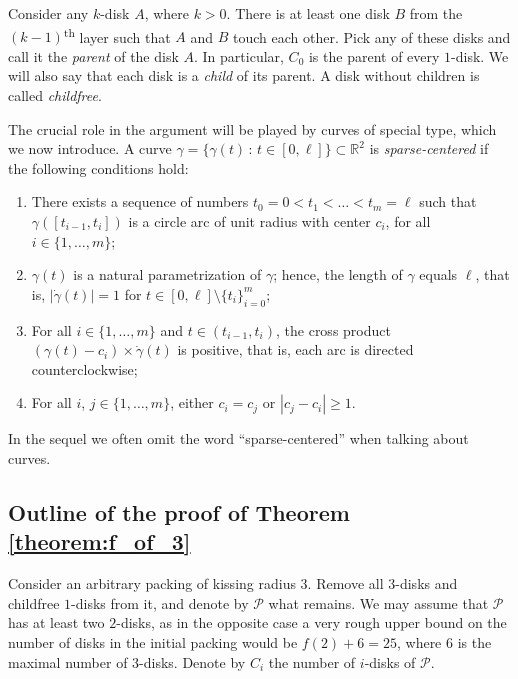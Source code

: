 Consider any $k$-disk $A$, where $k > 0$. There is at least one disk $B$ from the $(k-1)$\textsuperscript{th} layer such that $A$ and $B$ touch each other. Pick any of these disks and call it the \textit{parent} of the disk $A$.
In particular, $C_0$ is the parent of every $1$-disk. We will also say that each disk is a \emph{child} of its parent. A disk without children is called \emph{childfree}.

The crucial role in the argument will be played by curves of special type, which we now introduce. A curve $\gamma = \{\gamma(t)\,\colon\,t\in[0, \ell]\} \subset \mathbb{R}^2$ is \textit{sparse-centered} if the following conditions hold:

\begin{enumerate}[label=(\alph*)]
  \item There exists a sequence of numbers $t_0 = 0 < t_1 < \ldots < t_m=\ell$ such that $\gamma([t_{i-1}, t_i])$ is a circle arc of unit radius with center $c_i$, for all $i\in\{1, \ldots, m\}$;
  \item $\gamma(t)$ is a natural parametrization of $\gamma$; hence, the length of $\gamma$ equals $\ell$, that is, $|\dot{\gamma}(t)| = 1$ for $t\in[0, \ell]\setminus\{t_i\}_{i=0}^m$;
  \item For all $i\in\{1, \ldots, m\}$ and $t\in(t_{i-1}, t_i)$, the cross product $(\gamma(t) - c_i)\times \dot{\gamma}(t)$ is positive, that is, each arc is directed counterclockwise;
  \item For all $i$, $j\in\{1, \ldots, m\}$, either $c_i = c_j$ or $|c_j - c_i|\geq 1$.
\end{enumerate}

In the sequel we often omit the word ``sparse-centered'' when talking about curves.

\subsection{Outline of the proof of Theorem \ref{theorem:f_of_3}}

Consider an arbitrary packing of kissing radius $3$. Remove all $3$-disks and childfree $1$-disks from it, and denote by $\mathcal{P}$ what remains. We may assume that $\mathcal{P}$ has at least two $2$-disks, as in the opposite case a very rough upper bound on the number of disks in the initial packing would be $f(2) + 6 = 25$, where $6$ is the maximal number of $3$-disks. Denote by $C_i$ the number of $i$-disks of $\mathcal{P}$.

